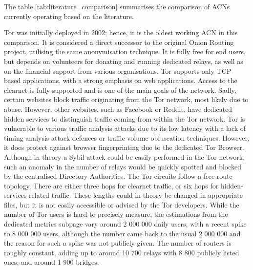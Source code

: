 The table \ref{tab:literature_comparison} summarises the comparison of ACNs currently operating based on the literature.

Tor was initially deployed in 2002; hence, it is the oldest working ACN in this comparison. It is considered a direct successor to the original Onion Routing project, utilising the same anonymisation technique. It is fully free for end users, but depends on volunteers for donating and running dedicated relays, as well as on the financial support from various organisations. Tor supports only TCP-based applications, with a strong emphasis on web applications. Access to the clearnet is fully supported and is one of the main goals of the network. Sadly, certain websites block traffic originating from the Tor network, most likely due to abuse. However, other websites, such as Facebook or Reddit, have dedicated hidden services to distinguish traffic coming from within the Tor network. Tor is vulnerable to various traffic analysis attacks due to its low latency with a lack of timing analysis attack defences or traffic volume obfuscation techniques. However, it does protect against browser fingerprinting due to the dedicated Tor Browser. Although in theory a Sybil attack could be easily performed in the Tor network, such an anomaly in the number of relays would be quickly spotted and blocked by the centralised Directory Authorities. The Tor circuits follow a free route topology. There are either three hops for clearnet traffic, or six hops for hidden-services-related traffic. These lengths could in theory be changed in appropriate files, but it is not easily accessible or advised by the Tor developers. While the number of Tor users is hard to precisely measure, the estimations from the dedicated metrics subpage vary around 2 000 000 daily users, with a recent spike to 8 000 000 users, although the number came back to the usual 2 000 000 and the reason for such a spike was not publicly given. The number of routers is roughly constant, adding up to around 10 700 relays with 8 800 publicly listed ones, and around 1 900 bridges.

